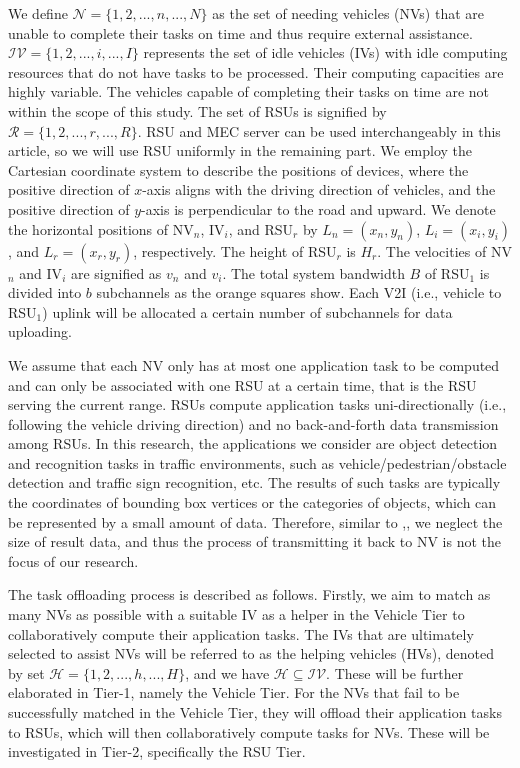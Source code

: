 \documentclass[lettersize,journal]{IEEEtran}
\begin{document}
We define $\mathcal{N}=\{1,2, ..., n, ...,N\}$ as the set of needing vehicles (NVs) that are unable to complete their tasks on time and thus require external assistance. $\mathcal{IV}=\{1,2, ..., i, ...,I\}$ represents the set of idle vehicles (IVs) with idle computing resources that do not have tasks to be processed. Their computing capacities are highly variable. The vehicles capable of completing their tasks on time are not within the scope of this study. The set of RSUs is signified by $\mathcal{R}=\{1,2, ..., r, ...,R\}$. RSU and MEC server can be used interchangeably in this article, so we will use RSU uniformly in the remaining part. We employ the Cartesian coordinate system to describe the positions of devices, where the positive direction of $x$-axis aligns with the driving direction of vehicles, and the positive direction of $y$-axis is perpendicular to the road and upward. We denote the horizontal positions of NV$_n$, IV$_i$, and RSU$_r$ by $L_n = (x_n, y_n)$, $L_i = (x_i, y_i)$, and $L_r = (x_r, y_r)$, respectively. The height of RSU$_r$ is $H_r$. The velocities of NV$_n$ and IV$_i$ are signified as $v_n$ and $v_i$. The total system bandwidth $B$ of RSU$_1$ is divided into $b$ subchannels as the orange squares show. Each V2I (i.e., vehicle to RSU$_1$) uplink will be allocated a certain number of subchannels for data uploading.


We assume that each NV only has at most one application task to be computed and can only be associated with one RSU at a certain time, that is the RSU serving the current range. RSUs compute application tasks uni-directionally (i.e., following the vehicle driving direction) and no back-and-forth data transmission among RSUs. In this research, the applications we consider are object detection and recognition tasks in traffic environments, such as vehicle/pedestrian/obstacle detection and traffic sign recognition, etc. The results of such tasks are typically the coordinates of bounding box vertices or the categories of objects, which can be represented by a small amount of data. Therefore, similar to \cite{ref12},\cite{ref13}, we neglect the size of result data, and thus the process of transmitting it back to NV is not the focus of our research.

The task offloading process is described as follows. Firstly, we aim to match as many NVs as possible with a suitable IV as a helper in the Vehicle Tier to collaboratively compute their application tasks. The IVs that are ultimately selected to assist NVs will be referred to as the helping vehicles (HVs), denoted by set $\mathcal{H}=\{1,2, ..., h, ...,H\}$, and we have $\mathcal{H} \subseteq \mathcal{IV}$. These will be further elaborated in Tier-1, namely the Vehicle Tier. For the NVs that fail to be successfully matched in the Vehicle Tier, they will offload their application tasks to RSUs, which will then collaboratively compute tasks for NVs. These will be investigated in Tier-2, specifically the RSU Tier.
\end{document}
